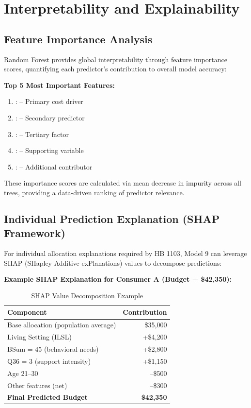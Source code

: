 \section{Interpretability and Explainability}

\subsection{Feature Importance Analysis}

Random Forest provides global interpretability through feature importance scores, quantifying each predictor's contribution to overall model accuracy:

\textbf{Top 5 Most Important Features:}
\begin{enumerate}
    \item \ModelNineTopFeatureOne{}: \ModelNineTopFeatureOneImportance{} -- Primary cost driver
    \item \ModelNineTopFeatureTwo{}: \ModelNineTopFeatureTwoImportance{} -- Secondary predictor
    \item \ModelNineTopFeatureThree{}: \ModelNineTopFeatureThreeImportance{} -- Tertiary factor
    \item \ModelNineTopFeatureFour{}: \ModelNineTopFeatureFourImportance{} -- Supporting variable
    \item \ModelNineTopFeatureFive{}: \ModelNineTopFeatureFiveImportance{} -- Additional contributor
\end{enumerate}

These importance scores are calculated via mean decrease in impurity across all trees, providing a data-driven ranking of predictor relevance.

\subsection{Individual Prediction Explanation (SHAP Framework)}

For individual allocation explanations required by HB 1103, Model 9 can leverage SHAP (SHapley Additive exPlanations) values to decompose predictions:

\textbf{Example SHAP Explanation for Consumer A (Budget = \$42,350):}

\begin{table}[h]
\centering
\caption{SHAP Value Decomposition Example}
\begin{tabular}{lr}
\toprule
\textbf{Component} & \textbf{Contribution} \\
\midrule
Base allocation (population average) & \$35,000 \\
Living Setting (ILSL) & +\$4,200 \\
BSum = 45 (behavioral needs) & +\$2,800 \\
Q36 = 3 (support intensity) & +\$1,150 \\
Age 21--30 & --\$500 \\
Other features (net) & --\$300 \\
\midrule
\textbf{Final Predicted Budget} & \textbf{\$42,350} \\
\bottomrule
\end{tabular}
\label{tab:model9_shap_example}
\end{table}

